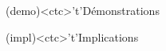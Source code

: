 \documentclass[../../main/main.tex]{subfiles}
\begin{document}
\begin{tcn}[%
		sidebyside, fontupper=\small, fontlower=\small
	]
	\begin{tcn}[nsp](demo)<ctc>'t'{Démonstrations}
	\end{tcn}
	\begin{tcn}[nsp](impl)<ctc>'t'{Implications}
	\end{tcn}

\end{tcn}
\end{document}
